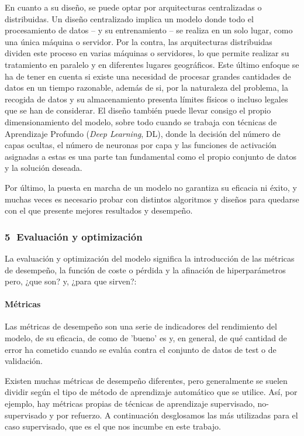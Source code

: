 \documentclass[00-Trabajo_Final.tex]{subfiles}
\begin{document}
En cuanto a su diseño, se puede optar por arquitecturas centralizadas o distribuidas. Un diseño centralizado implica un modelo donde todo el procesamiento de datos{ }--{ }y su entrenamiento{ }--{ }se realiza en un solo lugar, como una única máquina o servidor. Por la contra, las arquitecturas distribuidas dividen este proceso en varias máquinas o servidores, lo que permite realizar su tratamiento en paralelo y en diferentes lugares geográficos. Este último enfoque se ha de tener en cuenta si existe una necesidad de procesar grandes cantidades de datos en un tiempo razonable, además de si, por la naturaleza del problema, la recogida de datos y su almacenamiento presenta límites físicos o incluso legales que se han de considerar. El diseño también puede llevar consigo el propio dimensionamiento del modelo, sobre todo cuando se trabaja con técnicas de Aprendizaje Profundo (\textit{Deep Learning}, DL), donde la decisión del número de capas ocultas, el número de neuronas por capa y las funciones de activación asignadas a estas es una parte tan fundamental como el propio conjunto de datos y la solución deseada.

Por último, la puesta en marcha de un modelo no garantiza su eficacia ni éxito, y muchas veces es necesario probar con distintos algoritmos y diseños para quedarse con el que presente mejores resultados y desempeño.

\subsubsection*{\centering\textcircled{5} Evaluación y optimización}
La evaluación y optimización del modelo significa la introducción de las métricas de desempeño, la función de coste o pérdida y la afinación de hiperparámetros pero, ¿que son? y, ¿para que sirven?:

\paragraph*{Métricas} Las métricas de desempeño son una serie de indicadores del rendimiento del modelo, de su eficacia, de como de 'bueno' es y, en general, de qué cantidad de error ha cometido cuando se evalúa contra el conjunto de datos de test o de validación.

Existen muchas métricas de desempeño diferentes, pero generalmente se suelen dividir según el tipo de método de aprendizaje automático que se utilice. Así, por ejemplo, hay métricas propias de técnicas de aprendizaje supervisado, no-supervisado y por refuerzo. A continuación desglosamos las más utilizadas para el caso supervisado, que es el que nos incumbe en este trabajo.
\end{document}
